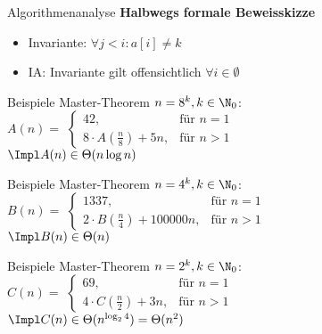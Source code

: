 \begin{frame}{Algorithmenanalyse}
	\textbf{Halbwegs formale Beweisskizze} \\[0,125cm]
	\pause
	\begin{itemize}
		\item Invariante: $\forall j < i: a[i] \neq k$
		\pause
		\item IA: Invariante gilt offensichtlich $\forall i \in \emptyset$
	\end{itemize}
\end{frame}


\iffalse  %

\begin{frame}{Beispiele Master-Theorem} 
	$n = 8^k, k \in \N_0$: \\[.5\baselineskip]
	$A(n) = $
	\begin{math}
		\begin{cases}
		42,                           & \text{für } n = 1 \\
		8 \cdot A(\frac{n}{8}) + 5n,  & \text{für } n > 1
		\end{cases}
	\end{math} \\[.5\baselineskip]
	\pause
	$\Impl A(n) \in \Theta(n\log n)$
\end{frame}



\begin{frame}{Beispiele Master-Theorem}
	$n = 4^k, k \in \N_0$: \\[.5\baselineskip]
	$B(n) = $
	\begin{math}
		\begin{cases}
		1337,                              & \text{für } n = 1 \\
		2 \cdot B(\frac{n}{4}) + 100000n,  & \text{für } n > 1
		\end{cases}
	\end{math} \\[.5\baselineskip]
	\pause
	$\Impl B(n) \in \Theta(n)$
\end{frame}


\begin{frame}{Beispiele Master-Theorem}
	$n = 2^k, k \in \N_0$: \\[0,25cm]
	$C(n) = $
	\begin{math}
		\begin{cases}
		69,                           & \text{für } n = 1 \\
		4 \cdot C(\frac{n}{2}) + 3n,  & \text{für } n > 1
		\end{cases}
	\end{math} \\[0,5cm]
	\pause
	$\Impl C(n) \in \Theta(n^{\log _{2}4}) = \Theta(n^2)$
\end{frame}


